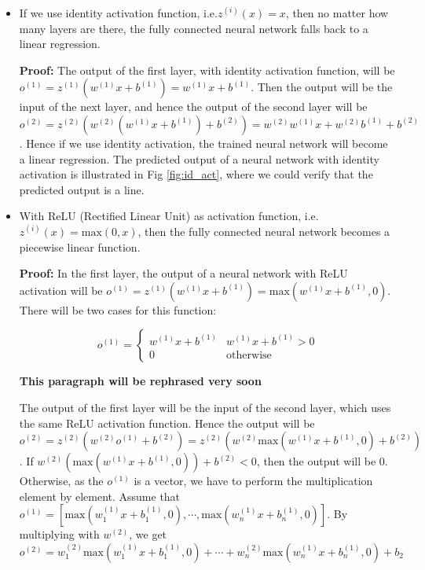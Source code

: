 \begin{itemize}
\item
  If we use identity activation function, i.e.$z^{(i)}(x)=x$, then no
  matter how many layers are there, the fully connected neural network
  falls back to a linear regression.

  \textbf{Proof:} The output of the first layer, with identity activation function, will be $o^{(1)}=z^{(1)}(w^{(1)}x+b^{(1)})=w^{(1)}x+b^{(1)}$. Then the output will be the input of the next layer, and hence the output of the second layer will be $o^{(2)}=z^{(2)}(w^{(2)}(w^{(1)}x+b^{(1)})+b^{(2)})=w^{(2)}w^{(1)}x+w^{(2)}b^{(1)}+b^{(2)}$. Hence if we use identity activation, the trained neural network will become a linear regression. The predicted output of a neural network with identity activation is illustrated in Fig \ref{fig:id_act}, where we could verify that the predicted output is a line.
\item
  With ReLU (Rectified Linear Unit) as activation function, i.e. $z^{(i)}(x)=\text{max}(0,x)$, then the fully connected neural network becomes a piecewise linear function.

\textbf{Proof:} In the first layer, the output of a neural network with ReLU activation will be $o^{(1)}=z^{(1)}(w^{(1)}x+b^{(1)})=\text{max}(w^{(1)}x+b^{(1)},0)$. There will be two cases for this function:

\begin{equation}
	o^{(1)}=\begin{cases}	
		w^{(1)}x+b^{(1)} & w^{(1)}x+b^{(1)}>0 \\
		0 & \text{otherwise}
	\end{cases}
\end{equation}

\textbf{This paragraph will be rephrased very soon}

The output of the first layer will be the input of the second layer, which uses the same ReLU activation function. Hence the output will be $o^{(2)}=z^{(2)}(w^{(2)}o^{(1)}+b^{(2)})=z^{(2)}(w^{(2)}\text{max}(w^{(1)}x+b^{(1)},0)+b^{(2)})$. If $w^{(2)}(\text{max}(w^{(1)}x+b^{(1)},0))+b^{(2)}<0$, then the output will be $0$. Otherwise, as the $o^{(1)}$ is a vector, we have to perform the multiplication element by element. Assume that $o^{(1)}=[\text{max}(w^{(1)}_{1}x+b^{(1)}_1, 0),\cdots,\text{max}(w^{(1)}_{n}x+b^{(1)}_n,0)]$. By multiplying with $w^{(2)}$, we get $$o^{(2)}=w^{(2)}_1\text{max}(w_1^{(1)}x+b^{(1)}_1, 0)+\cdots+w^{(2)}_n\text{max}(w_n^{(1)}x+b^{(1)}_n, 0)+b_2$$


\end{itemize}
